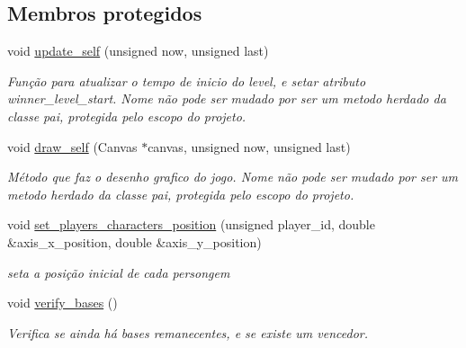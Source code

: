 \subsection*{Membros protegidos}
\begin{DoxyCompactItemize}
\item 
void \mbox{\hyperlink{classMainLevel_a4978a0e152f6a7b55bed0bad74dc7d5a}{update\+\_\+self}} (unsigned now, unsigned last)
\begin{DoxyCompactList}\small\item\em Função para atualizar o tempo de inicio do level, e setar atributo winner\+\_\+level\+\_\+start. Nome não pode ser mudado por ser um metodo herdado da classe pai, protegida pelo escopo do projeto. \end{DoxyCompactList}\item 
void \mbox{\hyperlink{classMainLevel_aabad926cf0366de353d716065ab792ad}{draw\+\_\+self}} (Canvas $\ast$canvas, unsigned now, unsigned last)
\begin{DoxyCompactList}\small\item\em Método que faz o desenho grafico do jogo. Nome não pode ser mudado por ser um metodo herdado da classe pai, protegida pelo escopo do projeto. \end{DoxyCompactList}\item 
void \mbox{\hyperlink{classMainLevel_a2e4098c0cac4f42f94b7fa6ecb14c7c7}{set\+\_\+players\+\_\+characters\+\_\+position}} (unsigned player\+\_\+id, double \&axis\+\_\+x\+\_\+position, double \&axis\+\_\+y\+\_\+position)
\begin{DoxyCompactList}\small\item\em seta a posição inicial de cada persongem \end{DoxyCompactList}\item 
void \mbox{\hyperlink{classMainLevel_a89ed36254771a662797d0ec50105015f}{verify\+\_\+bases}} ()
\begin{DoxyCompactList}\small\item\em Verifica se ainda há bases remanecentes, e se existe um vencedor. \end{DoxyCompactList}\end{DoxyCompactItemize}
